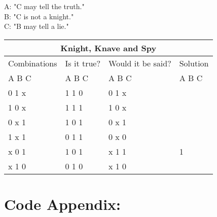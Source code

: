 \documentclass[11pt]{amsart}
\begin{document}
	A: "C may tell the truth."\\
	B: "C is not a knight."\\
	C: "B may tell a lie." \\


	\begin{tabular}{ |p{3cm}||p{3cm}|p{3cm}|p{3cm}|  }
	 \hline
	 \multicolumn{4}{|c|}{Knight, Knave and Spy} \\
	 \hline
	 Combinations & Is it true? & Would it be said? & Solution  \\ A  B  C   &   A  B  C  &   A  B  C & A  B  C \\
	 \hline
	  0   1   x  	& 1	1	0   & 0 1 x	&  \\
	  1   0   x		& 1	1	1  	& 1 0 x &  \\
	  0   x   1 	&	1	0	1 	& 0 x 1	&  \\
	  1   x   1  	&	0	1	1 	& 0 x 0	&  \\
	  x   0   1		& 1	0	1  	& x 1 1	& 1\\
	  x   1   0		& 0	1	0  	& x 1 0 &  \\

	 \hline
	\end{tabular}


\section{Code Appendix:}
\end{document}
